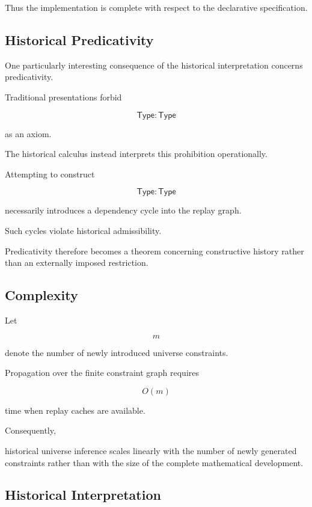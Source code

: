 \documentclass[12pt,oneside]{article}
\theoremstyle{definition}
\theoremstyle{remark}
\newcommand{\Type}{\mathsf{Type}}
\begin{document}
Thus the implementation is complete with respect to the declarative
specification.


\subsection{Historical Predicativity}

One particularly interesting consequence of the historical interpretation
concerns predicativity.

Traditional presentations forbid

\[
\Type
:
\Type
\]

as an axiom.

The historical calculus instead interprets this prohibition operationally.

Attempting to construct

\[
\Type
:
\Type
\]

necessarily introduces a dependency cycle into the replay graph.

Such cycles violate historical admissibility.

Predicativity therefore becomes a theorem concerning constructive history rather
than an externally imposed restriction.


\subsection{Complexity}

Let

\[
m
\]

denote the number of newly introduced universe constraints.

Propagation over the finite constraint graph requires

\[
O(m)
\]

time when replay caches are available.

Consequently,

historical universe inference scales linearly with the number of newly generated
constraints rather than with the size of the complete mathematical development.


\subsection{Historical Interpretation}
\end{document}
